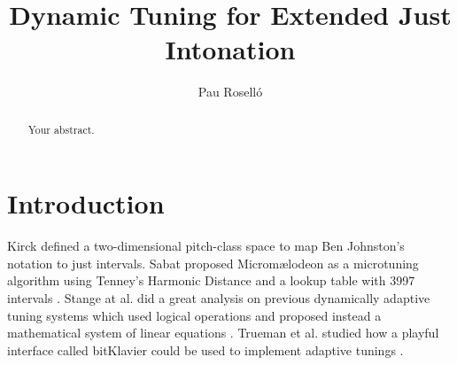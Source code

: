 \documentclass{article}
\title{Dynamic Tuning for Extended Just Intonation}
\author{Pau Roselló}
\begin{document}
\maketitle

\begin{abstract}
    Your abstract.
\end{abstract}

\section{Introduction}
Kirck defined a two-dimensional pitch-class space \cite{Kirck1987} to map Ben Johnston’s notation \cite{Johnston1977} to just intervals.
Sabat proposed Micromælodeon as a microtuning algorithm using Tenney's Harmonic Distance and a lookup table with 3997 intervals \cite{Sabat2008}.
Stange at al. did a great analysis on previous dynamically adaptive tuning systems which used logical operations and proposed instead a mathematical system of linear equations \cite{Stange2017}.
Trueman et al. studied how a playful interface called bitKlavier could be used to implement adaptive tunings \cite{Trueman2020}.



\end{document}
